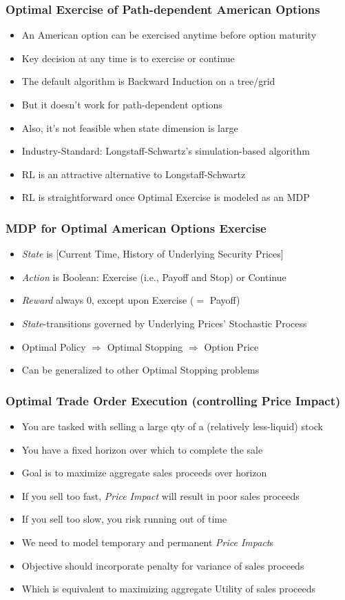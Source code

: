 \documentclass[handout]{beamer}
\begin{document}
\begin{frame}
\frametitle{Optimal Exercise of Path-dependent American Options}
\pause
\begin{itemize}[<+->]
\item An American option can be exercised anytime before option maturity
\item Key decision at any time is to exercise or continue
\item The default algorithm is Backward Induction on a tree/grid
\item But it doesn't work for path-dependent options 
\item Also, it's not feasible when state dimension is large
\item Industry-Standard: Longstaff-Schwartz's simulation-based algorithm
\item RL is an attractive alternative to Longstaff-Schwartz
\item RL is straightforward once Optimal Exercise is modeled as an MDP
\end{itemize}
\end{frame}

\begin{frame}
\frametitle{MDP for Optimal American Options Exercise}
\pause
\begin{itemize}[<+->]
\item {\em State} is [Current Time, History of Underlying Security Prices]
\item {\em Action} is Boolean: Exercise (i.e., Payoff and Stop) or Continue
\item {\em Reward} always 0, except upon Exercise ($=$ Payoff)
\item {\em State}-transitions governed by Underlying Prices' Stochastic Process
\item Optimal Policy $\Rightarrow$ Optimal Stopping $\Rightarrow$ Option Price
\item Can be generalized to other Optimal Stopping problems
\end{itemize}
\end{frame}

\begin{frame}
\frametitle{Optimal Trade Order Execution (controlling Price Impact)}
\pause
\begin{itemize}[<+->]
\item You are tasked with selling a large qty of a (relatively less-liquid) stock
\item You have a fixed horizon over which to complete the sale
\item Goal is to maximize aggregate sales proceeds over horizon
\item If you sell too fast, {\em Price Impact} will result in poor sales proceeds
\item If you sell too slow, you risk running out of time
\item We need to model temporary and permanent {\em Price Impact}s
\item Objective should incorporate penalty for variance of sales proceeds
\item Which is equivalent to maximizing aggregate Utility of sales proceeds 
\end{itemize}
\end{frame}
\end{document}
